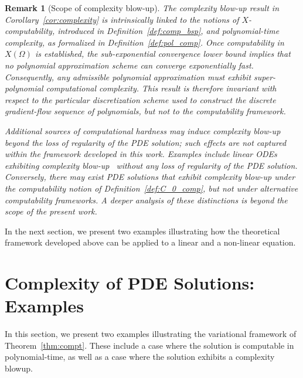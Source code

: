 \documentclass[pdflatex]{sn-jnl}%
\newtheorem{remark}[theorem]{Remark}
\begin{document}
\begin{remark}[Scope of complexity blow-up]
The complexity blow-up result in Corollary~\ref{cor:complexity} is intrinsically
linked to the notions of $X$-computability, introduced in
Definition~\ref{def:comp_bsp}, and polynomial-time complexity, as formalized in
Definition~\ref{def:pol_comp}. Once computability in $X(\Omega)$ is established,
the sub-exponential convergence lower bound implies that no polynomial
approximation scheme can converge exponentially fast. Consequently, any
admissible polynomial approximation must exhibit super-polynomial computational
complexity. This result is therefore invariant with respect to the particular
discretization scheme used to construct the discrete gradient-flow sequence of
polynomials, but not to the computability framework. 

Additional sources of computational hardness may induce complexity blow-up beyond
the loss of regularity of the PDE solution; such effects are not captured within the framework developed in this work. Examples include linear ODEs exhibiting
complexity blow-up~\cite{Boche2021} without any loss of regularity of the PDE solution. Conversely, there may exist PDE solutions
that exhibit complexity blow-up under the computability notion of
Definition~\ref{def:C_0_comp}, but not under alternative computability frameworks.
A deeper analysis of these distinctions is beyond the scope of the present work.
\end{remark}

In the next section, we present two examples illustrating how the theoretical framework developed above can be applied to a linear and a non-linear equation.
\section{Complexity of PDE Solutions: Examples}\label{sec:Experiments}
In this section, we present two examples illustrating the variational framework of Theorem~\ref{thm:compt}. These include a case where the solution is computable in polynomial-time, as well as a case where the solution exhibits a complexity blowup.
\end{document}
